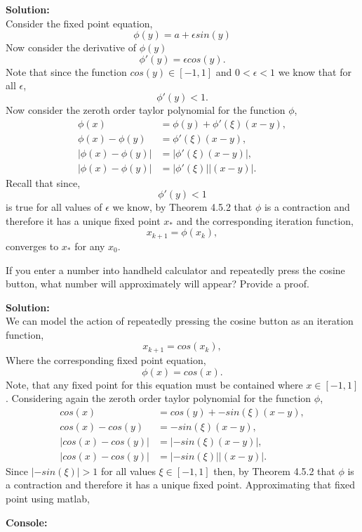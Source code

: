 \documentclass[12pt]{article}
\makeatletter
\theoremstyle{homework}
\newenvironment{exercise}[1]
{\def\@currentlabel{#1}\exercisecore}
{\endexercisecore}
\newcommand{\localhead}[1]{\par\smallskip\noindent\textbf{#1}\nobreak\\}%
\newcommand\solution{\localhead{Solution:}}
\makeatother
\begin{document}
\solution Consider the fixed point equation,
\begin{equation*}
  \phi(y) = a + \epsilon sin(y)
\end{equation*}
Now consider the derivative of $\phi(y)$
\begin{equation*}
  \phi'(y) =\epsilon cos(y).
\end{equation*}
Note that since the function $cos(y) \in [-1,1]$ and $0 < \epsilon < 1$ we know that for all $\epsilon$,
\begin{equation*}
  \phi'(y) < 1.
\end{equation*}
Now consider the zeroth order taylor polynomial for the function $\phi$,
\begin{align*}
  \phi(x) &= \phi(y) + \phi'(\xi)(x - y),\\
  \phi(x) - \phi(y) &= \phi'(\xi)(x - y),\\
  |\phi(x) - \phi(y)| &= |\phi'(\xi)(x - y)|,\\
  |\phi(x) - \phi(y)| &= |\phi'(\xi)||(x - y)|.
\end{align*}
Recall that since,
\begin{equation*}
  \phi'(y) < 1
\end{equation*}
is true for all values of $\epsilon$ we know, by Theorem 4.5.2 that $\phi$ is a contraction and therefore it has a unique fixed point
$x_*$ and the corresponding iteration function,
\begin{equation*}
  x_{k+1} = \phi(x_k),
\end{equation*}
converges to $x_*$ for any $x_0$.


\begin{exercise}{Chapter 4: 14} If you enter a number into handheld calculator and repeatedly press the cosine
  button, what number will approximately will appear? Provide a proof.  
\end{exercise}

\solution




We can model the action of repeatedly pressing the cosine button as an iteration function,
\begin{equation}
  x_{k+1} = cos(x_k),
\end{equation}
Where the corresponding fixed point equation,
\begin{equation*}
  \phi(x) = cos(x).
\end{equation*}
Note, that any fixed point for this equation must be contained where $x \in [-1,1]$. 
Considering again the zeroth order taylor polynomial for the function $\phi$,
\begin{align*}
  cos(x) &= cos(y) + -sin(\xi)(x - y),\\
  cos(x) - cos(y) &= -sin(\xi)(x - y),\\
  |cos(x) - cos(y)| &= |-sin(\xi)(x - y)|,\\
  |cos(x) - cos(y)| &= |-sin(\xi)||(x - y)|.
\end{align*}
Since $|-sin(\xi)|>1$ for all values $\xi \in [-1,1]$ then, by Theorem 4.5.2 that $\phi$ is a contraction and therefore it has a unique fixed point.
Approximating that fixed point using matlab,

\textbf{Console:}

\end{document}
